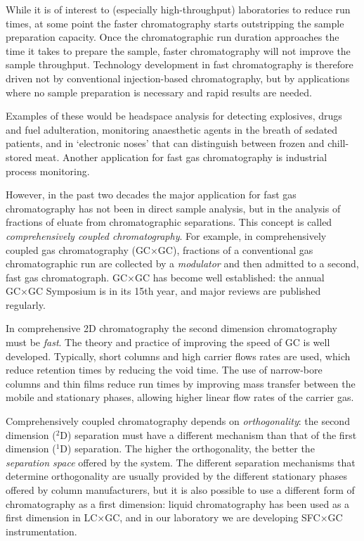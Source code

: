 \documentclass[aip,rsi,preprint,graphicx]{revtex4-1} %
\begin{document}
While it is of interest to (especially high-throughput) laboratories to reduce
run times, at some point the faster chromatography starts outstripping the
sample preparation capacity. Once the chromatographic run duration approaches
the time it takes to prepare the sample, faster chromatography will not improve
the sample throughput. Technology development in fast chromatography is
therefore driven not by conventional injection-based chromatography, but by
applications where no sample preparation is necessary and rapid results are
needed.

Examples of these would be headspace analysis for detecting
explosives\cite{Watson1991}, drugs\cite{He2014} and fuel
adulteration\cite{Hupp2018}, monitoring anaesthetic  agents in the breath of
sedated patients\cite*{Chen2014,Dong2017}, and in `electronic noses' that can
distinguish between frozen and chill-stored meat\cite{Gorska-Horczyczak2017}.
Another application for fast gas chromatography is industrial process
monitoring\cite{White2015}.

However, in the past two decades the major application for fast gas
chromatography has not been in direct sample analysis, but in the analysis of
fractions of eluate from chromatographic separations. This concept is called
\textit{comprehensively coupled chromatography}. For example, in comprehensively
coupled gas chromatography (GC×GC), fractions of a conventional gas
chromatographic run are collected by a \textit{modulator} and then admitted to a
second, fast gas chromatograph\cite{Liu1991}. GC×GC has become well
established: the annual GC×GC Symposium is in its 15th year, and major
reviews are published regularly\cite*{Seeley2013,Prebihalo2018}.

In comprehensive 2D chromatography the second dimension chromatography must be
\textit{fast}. The theory and practice of improving the speed of GC is well
developed\cite*{Cramers1999,Korytar2002}. Typically, short columns and high
carrier flows rates are used, which reduce retention times by reducing the
void time. The use of narrow-bore columns and thin films reduce run times by
improving mass transfer between the mobile and stationary phases, allowing
higher linear flow rates of the carrier gas.

Comprehensively coupled chromatography depends on \textit{orthogonality}: the
second dimension ($^2$D) separation must have a different mechanism than that of
the first dimension ($^1$D) separation\cite*{Giddings1995,Camenzuli2014}. The
higher the orthogonality, the better the \textit{separation space} offered by
the system. The different separation mechanisms that determine orthogonality are
usually provided by the different stationary phases offered by column
manufacturers, but it is also possible to use a different form of chromatography
as a first dimension: liquid chromatography has been used as a first dimension
in LC×GC\cite{Koning2004}, and in our laboratory we are developing
SFC×GC instrumentation\cite{Venter2004}.
\end{document}
